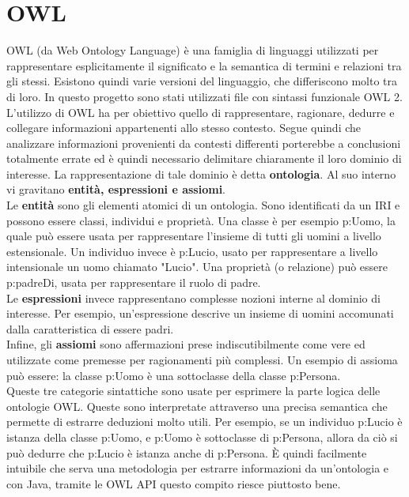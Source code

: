 \documentclass[Lau,binding=0.6cm]{sapthesis}
\begin{document}
\section{OWL}
OWL (da Web Ontology Language) è una famiglia di linguaggi utilizzati per rappresentare esplicitamente il significato e la semantica di termini e relazioni tra gli stessi. Esistono quindi varie versioni del linguaggio, che differiscono molto tra di loro. In questo progetto sono stati utilizzati file con sintassi funzionale OWL 2. L'utilizzo di OWL ha per obiettivo quello di rappresentare, ragionare, dedurre e collegare informazioni appartenenti allo stesso contesto. Segue quindi che analizzare informazioni provenienti da contesti differenti porterebbe a conclusioni totalmente errate ed è quindi necessario delimitare chiaramente il loro dominio di interesse. La rappresentazione di tale dominio è detta \textbf{ontologia}. Al suo interno vi gravitano \textbf{entità, espressioni e assiomi}.
\\Le \textbf{entità} sono gli elementi atomici di un ontologia. Sono identificati da un IRI e possono essere classi, individui e proprietà. 
	Una classe è per esempio p:Uomo, la quale può essere usata per rappresentare l'insieme di tutti gli uomini a livello 			estensionale.	
    Un individuo invece è p:Lucio, usato per rappresentare a livello intensionale un uomo chiamato "Lucio". 
	Una proprietà (o relazione) può essere p:padreDi, usata per rappresentare il ruolo di padre.
\\Le \textbf{espressioni} invece rappresentano complesse nozioni interne al dominio di interesse. Per esempio, un'espressione descrive un insieme di uomini accomunati dalla caratteristica di essere padri.
\\Infine, gli \textbf{assiomi} sono affermazioni prese indiscutibilmente come vere ed utilizzate come premesse per ragionamenti più complessi. Un esempio di assioma può essere: la classe p:Uomo è una sottoclasse della classe p:Persona.
\\Queste tre categorie sintattiche sono usate per esprimere la parte logica delle ontologie OWL. Queste sono interpretate attraverso una precisa semantica che permette di estrarre deduzioni molto utili. Per esempio, se un individuo p:Lucio è istanza 
della classe p:Uomo, e p:Uomo è sottoclasse di p:Persona, allora da ciò si può dedurre che p:Lucio è istanza anche di p:Persona.
È quindi facilmente intuibile che serva una metodologia per estrarre informazioni da un'ontologia e con Java, tramite le OWL API questo compito riesce piuttosto bene.
\end{document}
